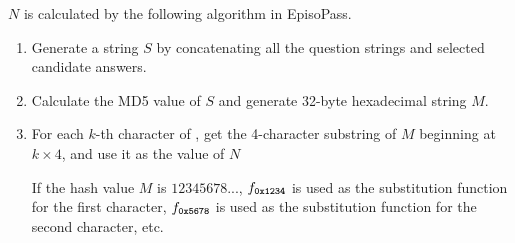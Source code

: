 \documentclass{sigchi}
\begin{document}

$N$ is calculated by the following algorithm in EpisoPass.
 
\begin{enumerate}
  \item Generate a string $S$ by concatenating all the question strings and selected candidate answers.

  \item Calculate the MD5 value of $S$ and generate 32-byte hexadecimal string $M$.

  \item For each $k$-th character of {\SS},
    get the 4-character substring of $M$ beginning at $k \times 4$, and use it as the value of $N$

    If the hash value $M$ is $12345678...$,
    $f_{\textbf{\texttt{\scriptsize 0x1234}}}$ is used as the substitution function for the first character,
    $f_{\textbf{\texttt{\scriptsize 0x5678}}}$ is used as the substitution function for the second character, etc.
\end{enumerate}
\end{document}
